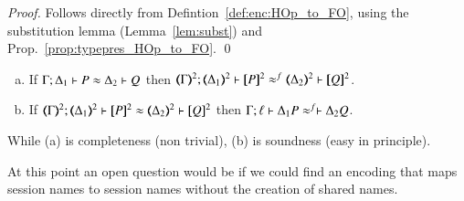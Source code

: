 \begin{proof}
	Follows directly from Defintion~\ref{def:enc:HOp_to_FO}, using the substitution lemma (Lemma~\ref{lem:subst})
	and Prop.~\ref{prop:typepres_HOp_to_FO}.
	\qed
\end{proof}

\begin{comment}
\begin{proof}[Sketch]
For completeness, we 
consider the \HO process $P = {\bbout{k}{\abs{x} Q} P_1} \Par \binp{k}{X} P_2$. We have that
\[
P \red P_1 \Par P_2 \subst{\abs{x}Q}{X}
\]
In the target language, this reduction is mimicked as follows:
\begin{eqnarray*}
\pmap{P}{2} & = & \newsp{a}{\bout{k}{a} (\pmap{P_1}{3} \Par \repl{} \binp{a}{y} \binp{y}{x} \pmap{Q}{3})\,} 
                  \Par \binp{k}{x} \pmap{P_2}{3} \\
            & \red & \newsp{a}{\pmap{P_1}{3} \Par \repl{} \binp{a}{y} \binp{y}{x} \pmap{Q}{3} 
                  \Par  \pmap{P_2}{3}\subst{a}{x}}
\end{eqnarray*}
\qed
\end{proof}
\end{comment}


\begin{conjecture}\rm
	\begin{enumerate}[a)]
		\item
			If
			$\Gamma; \Delta_1 \vdash P \approx \Delta_2 \vdash Q$
			then
			$\horel{\mapt{\Gamma}^{2}}{\mapt{\Delta_1}^{2}}{\map{P}^{2}}{\wbf}{\mapt{\Delta_2}^{2}}
			{\map{Q}^{2}}$.
		\item  
			If 
			$\horel{\mapt{\Gamma}^{2}}{\mapt{\Delta_1}^{2}}{\map{P}^{2}}{\wb}{\mapt{\Delta_2}^{2}}
			{\map{Q}^{2}}$
			then 
			$\Gamma; \ell \vdash \Delta_1  P  \approx^{f} \vdash  \Delta_2{Q}$.
	\end{enumerate}
	While (a) is  completeness (non trivial), (b) is soundness  (easy in principle).
\end{conjecture}

At this point an open  question would be if we could find an encoding that maps
session names to session names without the creation of shared names.


